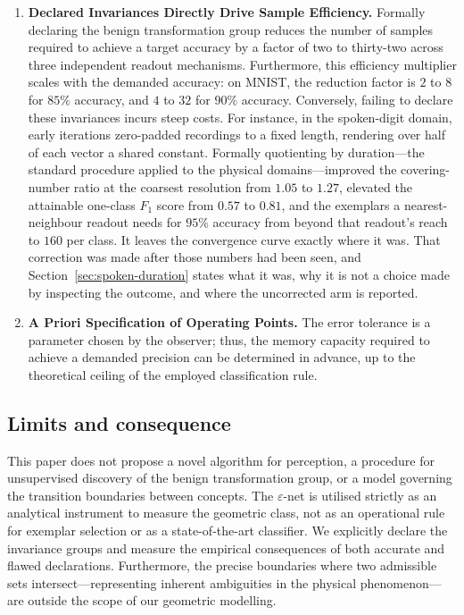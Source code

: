 \documentclass[10pt]{article}
\theoremstyle{plain}
\theoremstyle{definition}
\theoremstyle{remark}
\begin{document}
\begin{enumerate}
    concepts reside in the interior of the manifold, explaining their high sample
    efficiency.
  \item \textbf{Declared Invariances Directly Drive Sample Efficiency.} Formally
    declaring the benign transformation group reduces the number of samples required
    to achieve a target accuracy by a factor of two to thirty-two across three
    independent readout mechanisms. Furthermore, this efficiency multiplier scales
    with the demanded accuracy: on MNIST, the reduction factor is $2$ to $8$ for
    $85\%$ accuracy, and $4$ to $32$ for $90\%$ accuracy. Conversely, failing to
    declare these invariances incurs steep costs. For instance, in the spoken-digit
    domain, early iterations zero-padded recordings to a fixed length, rendering
    over half of each vector a shared constant. Formally quotienting by duration---the
    standard procedure applied to the physical domains---improved the covering-number
    ratio at the coarsest resolution from $1.05$ to $1.27$, elevated the attainable
    one-class $F_1$ score from $0.57$ to $0.81$, and the exemplars a nearest-neighbour
    readout needs for $95\%$ accuracy from beyond that readout's reach to
    $160$ per class. It leaves the convergence curve exactly where it was.
    That correction was made after those numbers had been seen, and
    Section~\ref{sec:spoken-duration} states what it was, why it is not a choice made
    by inspecting the outcome, and where the uncorrected arm is reported.
  \item \textbf{A Priori Specification of Operating Points.} The error tolerance is
    a parameter chosen by the observer; thus, the memory capacity required to
    achieve a demanded precision can be determined in advance, up to the theoretical
    ceiling of the employed classification rule.
\end{enumerate}

\subsection{Limits and consequence}

This paper does not propose a novel algorithm for perception, a procedure for
unsupervised discovery of the benign transformation group, or a model governing the
transition boundaries between concepts. The $\varepsilon$-net is utilised strictly
as an analytical instrument to measure the geometric class, not as an operational
rule for exemplar selection or as a state-of-the-art classifier. We explicitly
declare the invariance groups and measure the empirical consequences of both
accurate and flawed declarations. Furthermore, the precise boundaries where two
admissible sets intersect---representing inherent ambiguities in the physical
phenomenon---are outside the scope of our geometric modelling.
\end{document}
